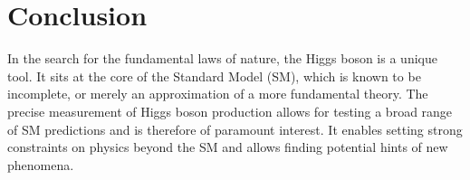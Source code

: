 \chapter{Conclusion}
\label{chap:conclusion}
In the search for the fundamental laws of nature, the Higgs boson is a unique tool. 
It sits at the core of the Standard Model (SM), which is known to be incomplete, or merely an approximation of a more fundamental theory. 
The precise measurement of Higgs boson production allows for testing a broad range of SM predictions and is therefore of paramount interest.
It enables setting strong constraints on physics beyond the SM and allows finding potential hints of new phenomena. %


